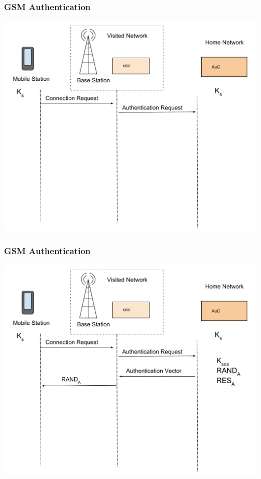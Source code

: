 \documentclass{beamer}
\begin{document}
\begin{frame}
  \frametitle{GSM Authentication}
  \begin{center}
  \includegraphics[width=.9\textwidth, height=.85\textheight]{Images/GSMAuthentication1.pdf}

  \end{center} 
\end{frame}
\begin{frame}
  \frametitle{GSM Authentication}
  \begin{center}
  \includegraphics[width=.9\textwidth, height=.85\textheight]{Images/GSMAuthentication2.pdf}

  \end{center} 
\end{frame}
\end{document}
